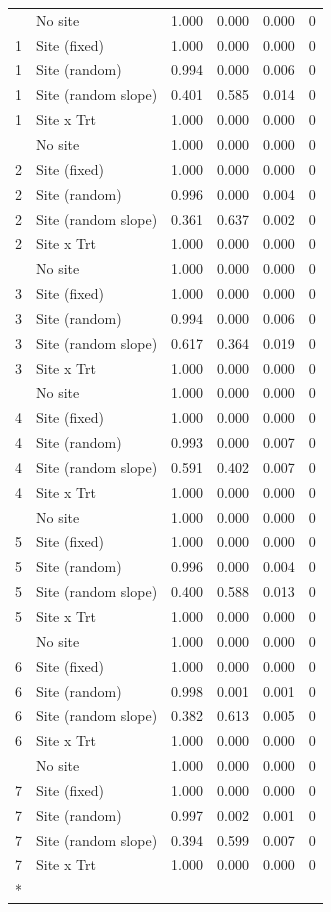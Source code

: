 \documentclass[
  11pt,
]{article}
\begin{document}
\begin{longtable}[t]{llrrrr}
\endfoot
\bottomrule
\endlastfoot
1 & No site & 1.000 & 0.000 & 0.000 & 0\\
1 & Site (fixed) & 1.000 & 0.000 & 0.000 & 0\\
1 & Site (random) & 0.994 & 0.000 & 0.006 & 0\\
1 & Site (random slope) & 0.401 & 0.585 & 0.014 & 0\\
1 & Site x Trt & 1.000 & 0.000 & 0.000 & 0\\
\addlinespace
2 & No site & 1.000 & 0.000 & 0.000 & 0\\
2 & Site (fixed) & 1.000 & 0.000 & 0.000 & 0\\
2 & Site (random) & 0.996 & 0.000 & 0.004 & 0\\
2 & Site (random slope) & 0.361 & 0.637 & 0.002 & 0\\
2 & Site x Trt & 1.000 & 0.000 & 0.000 & 0\\
\addlinespace
3 & No site & 1.000 & 0.000 & 0.000 & 0\\
3 & Site (fixed) & 1.000 & 0.000 & 0.000 & 0\\
3 & Site (random) & 0.994 & 0.000 & 0.006 & 0\\
3 & Site (random slope) & 0.617 & 0.364 & 0.019 & 0\\
3 & Site x Trt & 1.000 & 0.000 & 0.000 & 0\\
\addlinespace
4 & No site & 1.000 & 0.000 & 0.000 & 0\\
4 & Site (fixed) & 1.000 & 0.000 & 0.000 & 0\\
4 & Site (random) & 0.993 & 0.000 & 0.007 & 0\\
4 & Site (random slope) & 0.591 & 0.402 & 0.007 & 0\\
4 & Site x Trt & 1.000 & 0.000 & 0.000 & 0\\
\addlinespace
5 & No site & 1.000 & 0.000 & 0.000 & 0\\
5 & Site (fixed) & 1.000 & 0.000 & 0.000 & 0\\
5 & Site (random) & 0.996 & 0.000 & 0.004 & 0\\
5 & Site (random slope) & 0.400 & 0.588 & 0.013 & 0\\
5 & Site x Trt & 1.000 & 0.000 & 0.000 & 0\\
\addlinespace
6 & No site & 1.000 & 0.000 & 0.000 & 0\\
6 & Site (fixed) & 1.000 & 0.000 & 0.000 & 0\\
6 & Site (random) & 0.998 & 0.001 & 0.001 & 0\\
6 & Site (random slope) & 0.382 & 0.613 & 0.005 & 0\\
6 & Site x Trt & 1.000 & 0.000 & 0.000 & 0\\
\addlinespace
7 & No site & 1.000 & 0.000 & 0.000 & 0\\
7 & Site (fixed) & 1.000 & 0.000 & 0.000 & 0\\
7 & Site (random) & 0.997 & 0.002 & 0.001 & 0\\
7 & Site (random slope) & 0.394 & 0.599 & 0.007 & 0\\
7 & Site x Trt & 1.000 & 0.000 & 0.000 & 0\\*
\end{longtable}
\endgroup{}
\end{document}
